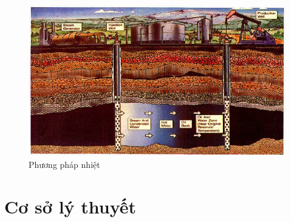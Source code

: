 \documentclass[12pt,a4paper]{article}
\begin{document}
	\begin{figure}[h]
		\centering
		\includegraphics[scale=.55]{Fig/Thermal.PNG}
		\caption{Phương pháp nhiệt \cite{green1998enhanced}}
	\end{figure}
	\clearpage

\section{Cơ sở lý thuyết}
\end{document}
